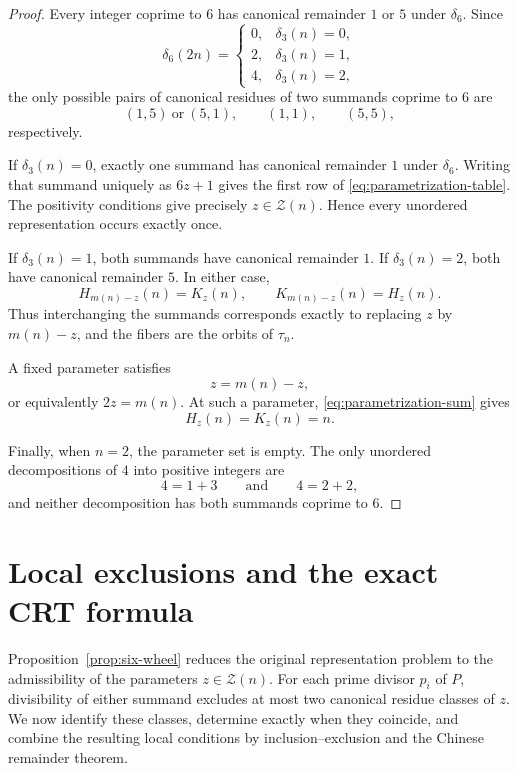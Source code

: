 \documentclass[12pt]{article}
\numberwithin{equation}{section}
\theoremstyle{definition}
\theoremstyle{remark}
\newcommand{\Zcal}{\mathcal Z}
\begin{document}
\begin{proof}
Every integer coprime to $6$ has canonical remainder $1$ or $5$
under $\delta_6$. Since
\[
\delta_6(2n)
=
\begin{cases}
0, & \delta_3(n)=0,\\
2, & \delta_3(n)=1,\\
4, & \delta_3(n)=2,
\end{cases}
\]
the only possible pairs of canonical residues of two summands
coprime to $6$ are
\[
(1,5)\ \text{or}\ (5,1),
\qquad
(1,1),
\qquad
(5,5),
\]
respectively.

If $\delta_3(n)=0$, exactly one summand has canonical remainder
$1$ under $\delta_6$. Writing that summand uniquely as $6z+1$
gives the first row of \eqref{eq:parametrization-table}. The
positivity conditions give precisely $z\in\Zcal(n)$. Hence every
unordered representation occurs exactly once.

If $\delta_3(n)=1$, both summands have canonical remainder $1$.
If $\delta_3(n)=2$, both have canonical remainder $5$. In either
case,
\[
H_{m(n)-z}(n)=K_z(n),
\qquad
K_{m(n)-z}(n)=H_z(n).
\]
Thus interchanging the summands corresponds exactly to replacing
$z$ by $m(n)-z$, and the fibers are the orbits of $\tau_n$.

A fixed parameter satisfies
\[
z=m(n)-z,
\]
or equivalently $2z=m(n)$. At such a parameter,
\eqref{eq:parametrization-sum} gives
\[
H_z(n)=K_z(n)=n.
\]

Finally, when $n=2$, the parameter set is empty. The only
unordered decompositions of $4$ into positive integers are
\[
4=1+3
\qquad\text{and}\qquad
4=2+2,
\]
and neither decomposition has both summands coprime to $6$.
\end{proof}

\section{Local exclusions and the exact CRT formula}

Proposition~\ref{prop:six-wheel} reduces the original
representation problem to the admissibility of the parameters
$z\in\Zcal(n)$. For each prime divisor $p_i$ of $P$,
divisibility of either summand excludes at most two canonical
residue classes of $z$. We now identify these classes, determine
exactly when they coincide, and combine the resulting local
conditions by inclusion--exclusion and the Chinese remainder
theorem.
\end{document}
